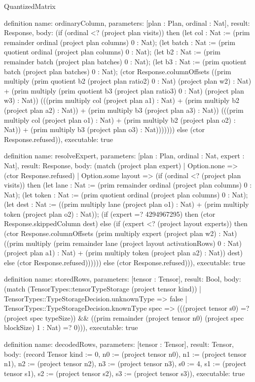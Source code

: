 \begin{lexlean}{QuantizedMatrix}
\begin{semanticmodule}
definition{
  name: ordinaryColumn,
  parameters: [plan : Plan, ordinal : Nat],
  result: Response,
  body: (if (ordinal <? (project plan visits)) then (let col : Nat := (prim remainder ordinal (project plan columns) 0 : Nat); (let batch : Nat := (prim quotient ordinal (project plan columns) 0 : Nat); (let b2 : Nat := (prim remainder batch (project plan batches) 0 : Nat); (let b3 : Nat := (prim quotient batch (project plan batches) 0 : Nat); (ctor Response.columnOffsets ((prim multiply (prim quotient b2 (project plan ratio2) 0 : Nat) (project plan w2) : Nat) + (prim multiply (prim quotient b3 (project plan ratio3) 0 : Nat) (project plan w3) : Nat)) (((prim multiply col (project plan a1) : Nat) + (prim multiply b2 (project plan a2) : Nat)) + (prim multiply b3 (project plan a3) : Nat)) (((prim multiply col (project plan o1) : Nat) + (prim multiply b2 (project plan o2) : Nat)) + (prim multiply b3 (project plan o3) : Nat))))))) else (ctor Response.refused)),
  executable: true
}

definition{
  name: resolveExpert,
  parameters: [plan : Plan, ordinal : Nat, expert : Nat],
  result: Response,
  body: (match (project plan expert)
    | Option.none => (ctor Response.refused)
    | Option.some layout => (if (ordinal <? (project plan visits)) then (let lane : Nat := (prim remainder ordinal (project plan columns) 0 : Nat); (let token : Nat := (prim quotient ordinal (project plan columns) 0 : Nat); (let dest : Nat := ((prim multiply lane (project plan o1) : Nat) + (prim multiply token (project plan o2) : Nat)); (if (expert =? 4294967295) then (ctor Response.skippedColumn dest) else (if (expert <? (project layout experts)) then (ctor Response.columnOffsets (prim multiply expert (project plan w2) : Nat) ((prim multiply (prim remainder lane (project layout activationRows) 0 : Nat) (project plan a1) : Nat) + (prim multiply token (project plan a2) : Nat)) dest) else (ctor Response.refused)))))) else (ctor Response.refused))),
  executable: true
}

definition{
  name: storedRows,
  parameters: [tensor : Tensor],
  result: Bool,
  body: (match (TensorTypes::tensorTypeStorage (project tensor kind))
    | TensorTypes::TypeStorageDecision.unknownType => false
    | TensorTypes::TypeStorageDecision.knownType spec =>
      (((project tensor s0) =? (project spec typeSize)) &&
        ((prim remainder (project tensor n0) (project spec blockSize) 1 : Nat) =? 0))),
  executable: true
}

definition{
  name: decodedRows,
  parameters: [tensor : Tensor],
  result: Tensor,
  body: (record Tensor {kind := 0, n0 := (project tensor n0), n1 := (project tensor n1), n2 := (project tensor n2), n3 := (project tensor n3),
      s0 := 4, s1 := (project tensor s1), s2 := (project tensor s2), s3 := (project tensor s3)}),
  executable: true
}


\end{semanticmodule}
\end{lexlean}
